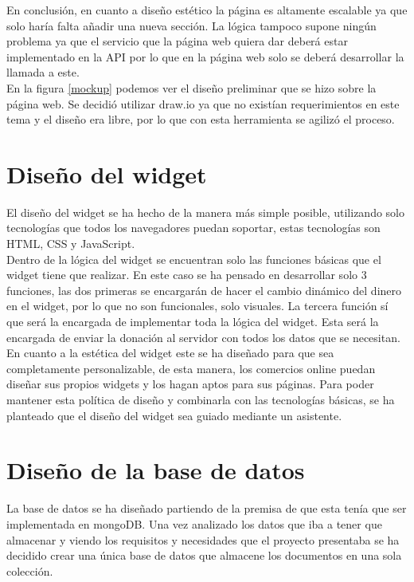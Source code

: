 En conclusión, en cuanto a diseño estético la página es altamente escalable ya que solo haría falta añadir una nueva sección. La lógica tampoco supone ningún problema ya que el servicio que la página web quiera dar deberá estar implementado en la API por lo que en la página web solo se deberá desarrollar la llamada a este.\\

En la figura \ref{mockup} podemos ver el diseño preliminar que se hizo sobre la página web. Se decidió utilizar draw.io ya que no existían requerimientos en este tema y el diseño era libre, por lo que con esta herramienta se agilizó el proceso.


\section{Diseño del widget}
El diseño del widget se ha hecho de la manera más simple posible, utilizando solo tecnologías que todos los navegadores puedan soportar, estas tecnologías son HTML, CSS y JavaScript.\\

Dentro de la lógica del widget se encuentran solo las funciones básicas que el widget tiene que realizar. En este caso se ha pensado en desarrollar solo 3 funciones, las dos primeras se encargarán de hacer el cambio dinámico del dinero en el widget, por lo que no son funcionales, solo visuales. La tercera función sí que será la encargada de implementar toda la lógica del widget. Esta será la encargada de enviar la donación al servidor con todos los datos que se necesitan.\\

En cuanto a la estética del widget este se ha diseñado para que sea completamente personalizable, de esta manera, los comercios online puedan diseñar sus propios widgets y los hagan aptos para sus páginas. Para poder mantener esta política de diseño y combinarla con las tecnologías básicas, se ha planteado que el diseño del widget sea guiado mediante un asistente.

\section{Diseño de la base de datos}
La base de datos se ha diseñado partiendo de la premisa de que esta tenía que ser implementada en mongoDB. Una vez analizado los datos que iba a tener que almacenar y viendo los requisitos y necesidades que el proyecto presentaba se ha decidido crear una única base de datos que almacene los documentos en una sola colección.\\

